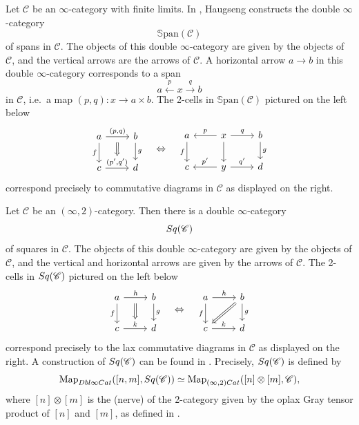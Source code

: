 \documentclass[a4paper, 11pt]{amsart}
\numberwithin{theorem}{section}
\theoremstyle{definition}
\newcommand{\cat}[1]{\textup{#1}}
\newcommand{\map}{\mathrm{Map}}
\newcommand{\Cat}{\cat{Cat}}
\newcommand{\C}{\mathscr{C}}
\newcommand{\DbliCat}{\cat{Dbl}\infty\cat{Cat}}
\newcommand{\Sq}{\cat{Sq}}
\newcommand{\SSPAN}{\mathbb{S}\mathrm{pan}}
\begin{document}
\begin{example}\label{example.dbl-cat-spans}
	Let $\C$ be an $\infty$-category with finite limits. In \cite{HaugsengSpans}, Haug\-seng constructs the double $\infty$-category 
	$$
	\SSPAN(\C)
	$$
	of spans in $\C$. The objects of this double $\infty$-category are given by the objects of $\C$, and the vertical arrows are the arrows of $\C$. 
	A horizontal arrow $a \rightarrow b$ in this double $\infty$-category corresponds to a span
	$$
	a \xleftarrow{p} x \xrightarrow{q} b
	$$
	in $\C$, i.e.\ a map $(p,q) : x \rightarrow a\times b$.
	The 2-cells in $\SSPAN(\C)$ pictured on the left below
	\[
	\begin{tikzcd}
		a \arrow[r, "{(p,q)}"name=f] \arrow[d,"f"'] & b \arrow[d,"g"] \\
		c \arrow[r,"{(p',q')}"name=t] & d
		\arrow[from=f, to=t, Rightarrow, shorten <= 6pt]
	\end{tikzcd}
	\quad 
	\Leftrightarrow
	\quad
	\begin{tikzcd}
		a\arrow[d,"f"'] & \arrow[l,"p"']  x\arrow[d] \arrow[r,"q"] & b\arrow[d,"g"] \\
		c & \arrow[l,"p'"']  y \arrow[r,"q'"] & d
	\end{tikzcd}
	\]
	correspond precisely to commutative diagrams in $\C$ as displayed on the right.
\end{example}

\begin{example}\label{ex.squares}
	Let $\C$ be an $(\infty,2)$-category. Then there is a double $\infty$-category
	$$
	\Sq(\C)
	$$
	of squares in $\C$. The objects of this double $\infty$-category are given by the objects of $\C$, 
	and the vertical and horizontal arrows are given by the arrows of $\C$.
	The 2-cells in $\Sq(\C)$ pictured on the left below
	\[
	\begin{tikzcd}
		a \arrow[r, "h"name=f] \arrow[d,"f"'] & b \arrow[d,"g"] \\
		c \arrow[r,"k"name=t] & d
		\arrow[from=f, to=t, Rightarrow, shorten <= 6pt]
	\end{tikzcd}
	\quad 
	\Leftrightarrow
	\quad
	\begin{tikzcd}
		a \arrow[r, "h"] \arrow[d,"f"'] & |[alias=f]| b \arrow[d,"g"] \\
		|[alias=t]| c \arrow[r,"k"] & d
		\arrow[from=f, to=t, Rightarrow]
	\end{tikzcd}
	\]
	correspond precisely to the lax commutative diagrams in $\C$ as displayed on the right.
	A construction of $\Sq(\C)$ can be found in \cite[Section 3.6]{Comp}. Precisely, $\Sq(\C)$ is defined by
	$$
		\map_{\DbliCat}([n,m], \Sq(\C)) \simeq \map_{(\infty,2)\Cat}([n] \otimes [m], \C),
	$$
	where $[n] \otimes [m]$ is the (nerve) of the 2-category given by the oplax Gray tensor product
	of $[n]$ and $[m]$, as defined in \cite{Gray}.
\end{example}
\end{document}
